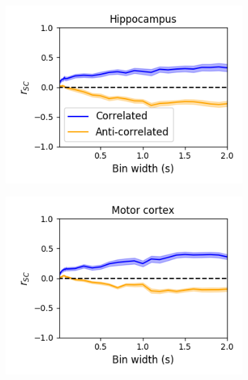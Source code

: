 \documentclass[a4paper,12pt]{article}
\theoremstyle{definition}
\begin{document}
\begin{figure}[p]
  \begin{subfigure}{0.5\textwidth}
    \centering
    \includegraphics[width=\textwidth]{figures/linear_bin_width_relative_correlations_hippocampus_15.png}
  \end{subfigure}
  \begin{subfigure}{0.5\textwidth}
    \centering
    \includegraphics[width=\textwidth]{figures/linear_bin_width_relative_correlations_motor_cortex_15.png}
  \end{subfigure}
  \begin{subfigure}{0.5\textwidth}
    \centering

\end{subfigure}
\end{figure}
\end{document}
